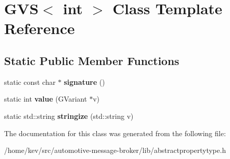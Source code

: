 \hypertarget{classGVS_3_01int_01_4}{\section{G\-V\-S$<$ int $>$ Class Template Reference}
\label{classGVS_3_01int_01_4}
}
\subsection*{Static Public Member Functions}
\begin{DoxyCompactItemize}
\item 
\hypertarget{classGVS_3_01int_01_4_aac00b94bc9b614c9adafdecc671b895e}{static const char $\ast$ {\bfseries signature} ()}\label{classGVS_3_01int_01_4_aac00b94bc9b614c9adafdecc671b895e}

\item 
\hypertarget{classGVS_3_01int_01_4_af57dd531535ceb741c65a90520aba578}{static int {\bfseries value} (G\-Variant $\ast$v)}\label{classGVS_3_01int_01_4_af57dd531535ceb741c65a90520aba578}

\item 
\hypertarget{classGVS_3_01int_01_4_ac284bb5efd7dc2bb3f641c94317a3385}{static std\-::string {\bfseries stringize} (std\-::string v)}\label{classGVS_3_01int_01_4_ac284bb5efd7dc2bb3f641c94317a3385}

\end{DoxyCompactItemize}


The documentation for this class was generated from the following file\-:\begin{DoxyCompactItemize}
\item 
/home/kev/src/automotive-\/message-\/broker/lib/abstractpropertytype.\-h\end{DoxyCompactItemize}
